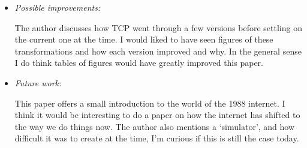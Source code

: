 \documentclass[letterpaper,twocolumn,10pt]{article}
\begin{document}
\begin{itemize}
\item {\it Possible improvements:} 

The author discusses how TCP went through a few versions before settling on the current one at the time. I would 
liked to have seen figures of these transformations and how each version improved and why. In the general sense
I do think tables of figures would have greatly improved this paper. 

\item {\it Future work:}

This paper offers a small introduction to the world of the 1988 internet. I think it would be interesting to do a paper on
how the internet has shifted to the way we do things now. The author also mentions a `simulator',  and how difficult it 
was to create at the time, I'm curious if this is still the case today.

\end{itemize}

{
  \small 
  
  
}
\end{document}
